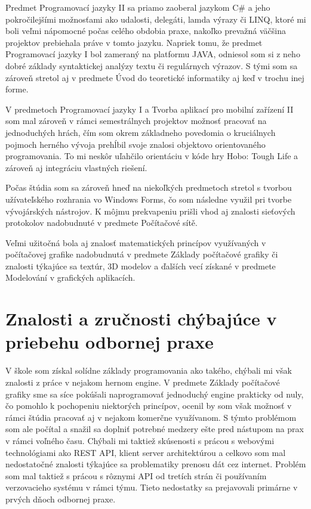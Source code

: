 \documentclass[slovak, bachelorpractice]{diploma}
\begin{document}
Predmet Programovací jazyky II sa priamo zaoberal jazykom C\# a jeho pokročilejšími možnosťami ako udalosti, delegáti, lamda výrazy či LINQ, ktoré mi boli veľmi nápomocné počas celého obdobia praxe, nakoľko prevažná väčšina projektov prebiehala práve v tomto jazyku. Napriek tomu, že predmet Programovací jazyky I bol zameraný na platformu JAVA, odniesol som si z neho dobré základy syntaktickej analýzy textu či regulárnych výrazov. S tými som sa zároveň stretol aj v predmete Úvod do teoretické informatiky aj keď v trochu inej forme. 

V predmetoch Programovací jazyky I a Tvorba aplikací pro mobilní zařízení II som mal zároveň v rámci semestrálnych projektov možnosť pracovať na jednoduchých hrách, čím som okrem základneho povedomia o kruciálnych pojmoch herného vývoja prehĺbil svoje znalosi objektovo orientovaného programovania. To mi neskôr uľahčilo orientáciu v kóde hry Hobo: Tough Life a zároveň aj integráciu vlastných riešení.

Počas štúdia som sa zároveň hneď na niekoľkých predmetoch stretol s tvorbou užívateľského rozhrania vo Windows Forms, čo som následne využil pri tvorbe vývojárských nástrojov. K môjmu prekvapeniu prišli vhod aj znalosti sieťových protokolov nadobudnuté v predmete Počítačové sítě.

Veľmi užitočná bola aj znalosť matematických princípov využívaných v počítačovej grafike nadobudnutá v predmete Základy počítačové grafiky či znalosti týkajúce sa textúr, 3D modelov a ďalších vecí získané v predmete Modelování v grafických aplikacích.

\label{sec:techZruc}
\section{Znalosti a zručnosti chýbajúce v priebehu odbornej praxe}
\label{sec:coNeviem}
V škole som získal solídne základy programovania ako takého, chýbali mi však znalosti z práce v nejakom hernom engine. V predmete Základy počítačové grafiky sme sa síce pokúšali naprogramovať jednoduchý engine prakticky od nuly, čo pomohlo k pochopeniu niektorých princípov, ocenil by som však možnosť v rámci štúdia pracovať aj v nejakom komerčne využívanom. S týmto problémom som ale počítal a snažil sa doplniť potrebné medzery ešte pred nástupom na prax v rámci voľného času. Chýbali mi taktiež skúsenosti s prácou s webovými technológiami ako REST API, klient server architektúrou a celkovo som mal nedostatočné znalosti týkajúce sa problematiky prenosu dát cez internet. Problém som mal taktiež s prácou s rôznymi API od tretích strán či používaním verzovacieho systému v rámci týmu. Tieto nedostatky sa prejavovali primárne v prvých dňoch odbornej praxe.
\end{document}
